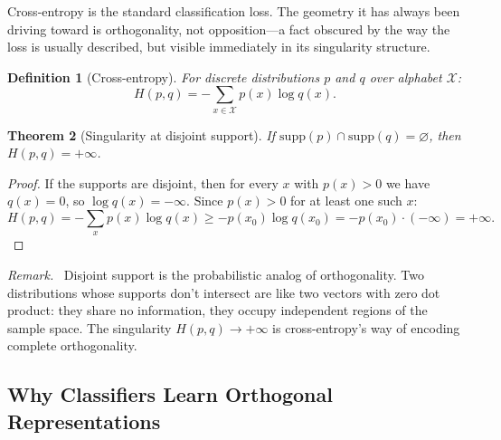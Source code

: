 \documentclass[11pt,a4paper]{article}
\newtheorem{theorem}{Theorem}
\newtheorem{definition}[theorem]{Definition}
\theoremstyle{remark}
\newenvironment{geometricinsight}{\par\medskip\noindent\textit{Remark.}\ }{\par\medskip}
\begin{document}
Cross-entropy is the standard classification loss.
The geometry it has always been driving toward is orthogonality, not opposition---a fact obscured by the way the loss is usually described, but visible immediately in its singularity structure.

\begin{definition}[Cross-entropy]
For discrete distributions $p$ and $q$ over alphabet $\mathcal{X}$:
\begin{equation}
  H(p, q) = -\sum_{x \in \mathcal{X}} p(x) \log q(x).
  \label{eq:cross-entropy}
\end{equation}
\end{definition}

\begin{theorem}[Singularity at disjoint support]
\label{thm:singularity}
If $\mathrm{supp}(p) \cap \mathrm{supp}(q) = \varnothing$, then $H(p, q) = +\infty$.
\end{theorem}

\begin{proof}
If the supports are disjoint, then for every $x$ with $p(x) > 0$ we have $q(x) = 0$, so $\log q(x) = -\infty$.
Since $p(x) > 0$ for at least one such $x$:
\[
  H(p,q) = -\sum_{x} p(x) \log q(x) \geq -p(x_0) \log q(x_0) = -p(x_0) \cdot (-\infty) = +\infty.
\]
\end{proof}

\begin{geometricinsight}
Disjoint support is the probabilistic analog of orthogonality.
Two distributions whose supports don't intersect are like two vectors with zero dot product: they share no information, they occupy independent regions of the sample space.
The singularity $H(p,q) \to +\infty$ is cross-entropy's way of encoding complete orthogonality.
\end{geometricinsight}

\subsection{Why Classifiers Learn Orthogonal Representations}
\end{document}
